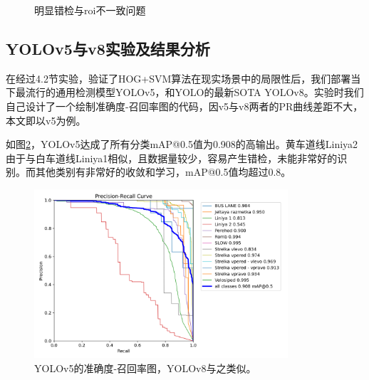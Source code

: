 \documentclass{article}
\begin{document}
\begin{figure}[H]
\begin{minipage}[t]{0.49\linewidth}
        \caption{明显错检与roi不一致问题}
        \label{fig:3}
    \end{minipage}
 \end{figure}

\subsection{YOLOv5与v8实验及结果分析}

在经过4.2节实验，验证了HOG+SVM算法在现实场景中的局限性后，我们部署当下最流行的通用检测模型YOLOv5，和YOLO的最新SOTA YOLOv8。实验时我们自己设计了一个绘制准确度-召回率图的代码，因v5与v8两者的PR曲线差距不大，本文即以v5为例。

如图\ref{fig:4}，YOLOv5达成了所有分类mAP@0.5值为0.908的高输出。黄车道线Liniya2由于与白车道线Liniya1相似，且数据量较少，容易产生错检，未能非常好的识别。而其他类别有非常好的收敛和学习，mAP@0.5值均超过0.8。
\begin{figure}[H]
    \centering
    \includegraphics[width=0.84\textwidth]{YOLOv5/train_yolov5/PR_curve.png}
    \caption{YOLOv5的准确度-召回率图，YOLOv8与之类似。}
    \label{fig:4}
\end{figure}
\end{document}
